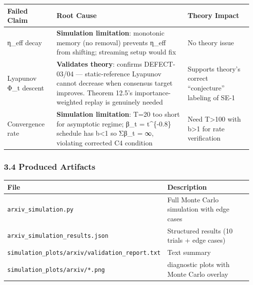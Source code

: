 \documentclass[
  12pt,
]{ctexart}
\begin{document}
\begin{longtable}[]{@{}
  >{\raggedright\arraybackslash}p{}
  >{\raggedright\arraybackslash}p{}
  >{\raggedright\arraybackslash}p{}@{}}
\toprule\noalign{}
\begin{minipage}[b]{\linewidth}\raggedright
Failed Claim
\end{minipage} & \begin{minipage}[b]{\linewidth}\raggedright
Root Cause
\end{minipage} & \begin{minipage}[b]{\linewidth}\raggedright
Theory Impact
\end{minipage} \\
\midrule\noalign{}
\endhead
\bottomrule\noalign{}
\endlastfoot
η\_eff decay & \textbf{Simulation limitation}: monotonic memory (no
removal) prevents η\_eff from shifting; streaming setup would fix & No
theory issue \\
Lyapunov Φ\_t descent & \textbf{Validates theory}: confirms DEFECT-03/04
--- static-reference Lyapunov cannot decrease when consensus target
improves. Theorem 12.5's importance-weighted replay is genuinely needed
& Supports theory's correct ``conjecture'' labeling of SE-1 \\
Convergence rate & \textbf{Simulation limitation}: T=20 too short for
asymptotic regime; β\_t = t\^{}\{-0.8\} schedule has b\textless1 so
Σβ\_t = ∞, violating corrected C4 condition & Need T\textgreater100 with
b\textgreater1 for rate verification \\
\end{longtable}

\subsubsection{3.4 Produced Artifacts}\label{produced-artifacts}

\begin{longtable}[]{@{}
  >{\raggedright\arraybackslash}p{}
  >{\raggedright\arraybackslash}p{}@{}}
\toprule\noalign{}
\begin{minipage}[b]{\linewidth}\raggedright
File
\end{minipage} & \begin{minipage}[b]{\linewidth}\raggedright
Description
\end{minipage} \\
\midrule\noalign{}
\endhead
\bottomrule\noalign{}
\endlastfoot
\texttt{arxiv\_simulation.py} & Full Monte Carlo simulation with edge
cases \\
\texttt{arxiv\_simulation\_results.json} & Structured results (10 trials
+ edge cases) \\
\texttt{simulation\_plots/arxiv/validation\_report.txt} & Text
summary \\
\texttt{simulation\_plots/arxiv/*.png} & 6 diagnostic plots with Monte
Carlo overlay \\
\end{longtable}
\end{document}

